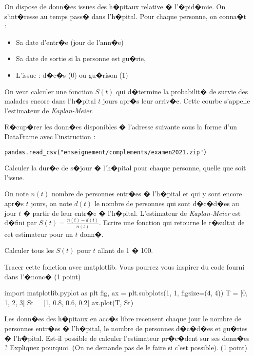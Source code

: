 %



\exosubject{}
\begin{xexercice}\label{td_note_label1_2021}%

On dispose de donn�es issues des h�pitaux relative � l'�pid�mie. On s'int�resse au temps pass� dans l'h�pital. Pour chaque personne, on conna�t :
\begin{itemize}
\item Sa date d'entr�e (jour de l'ann�e)
\item Sa date de sortie si la personne est gu�rie,
\item L'issue : d�c�s (0) ou gu�rison (1)
\end{itemize}

On veut calculer une fonction $S(t)$ qui d�termine la probabilit� de survie des malades encore dans l'h�pital $t$ jours apr�s leur arriv�e. Cette courbe s'appelle l'estimateur de \textit{Kaplan-Meier}.

\exequest R�cup�rer les donn�es disponibles � l'adresse suivante sous la forme d'un DataFrame avec l'instruction :

\texttt{pandas.read\_csv("enseignement/complements/examen2021.zip")}

\exequest Calculer la dur�e de s�jour � l'h�pital pour chaque personne, quelle que soit l'issue.

\exequest On note $n(t)$ nombre de personnes entr�es � l'h�pital et qui y sont encore apr�s $t$ jours, on note $d(t)$ le nombre de personnes qui sont d�c�d�es au jour $t$ � partir de leur entr�e � l'h�pital. L'estimateur de \textit{Kaplan-Meier} est d�fini par $S(t)=\frac{n(t) - d(t)}{n(t)}$. Ecrire une fonction qui retourne le r�sultat de cet estimateur pour un $t$ donn�.

\exequest Calculer tous les $S(t)$ pour $t$ allant de 1 � 100.

\exequest Tracer cette fonction avec matplotlib. Vous pourrez vous inspirer du code fourni dans l'�nonc� (1 point)


\begin{verbatimx}
import matplotlib.pyplot as plt
fig, ax = plt.subplots(1, 1, figsize=(4, 4))
T = [0, 1, 2, 3]
St = [1, 0.8, 0.6, 0.2]
ax.plot(T, St)
\end{verbatimx}

\exequest Les donn�es des h�pitaux en acc�s libre recensent chaque jour le nombre de personnes entr�es � l'h�pital, le nombre de personnes d�c�d�es et gu�ries � l'h�pital. Est-il possible de calculer l'estimateur pr�c�dent sur ses donn�es ? Expliquez pourquoi. (On ne demande pas de le faire si c'est possible). (1 point)

\end{xexercice}

